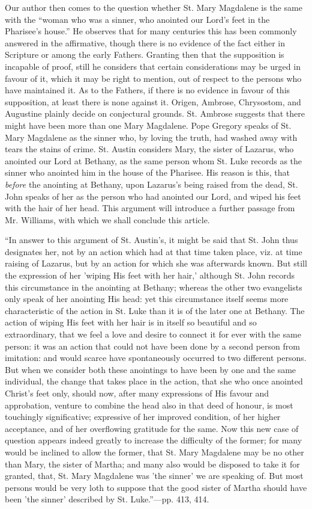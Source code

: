 Our author then comes to the question whether St.
Mary Magdalene is the same with the ``woman who was a sinner, who
anointed our Lord's feet in the Pharisee's house.'' He observes that for
many centuries this has been commonly answered in the affirmative,
though there is no evidence of the fact either in Scripture or among the
early Fathers. Granting then that the supposition is incapable of proof,
still he considers that certain considerations may be urged in favour of
it, which it may be right to mention, out of respect to the persons who
have maintained it. As to the Fathers, if there is no evidence in favour
of this supposition, at least there is none against it. Origen, Ambrose,
Chrysostom, and Augustine plainly decide on conjectural grounds. St.
Ambrose suggests that there might have been more than one Mary
Magdalene. Pope Gregory speaks of St. Mary Magdalene as the sinner who,
by loving the truth, had washed away with tears the stains of crime. St.
Austin considers Mary, the sister of Lazarus, who anointed our Lord at
Bethany, as the same person whom St. Luke records as the sinner who
anointed him in the house of the Pharisee. His reason is this, that \emph{before}
the anointing at Bethany, upon Lazarus's being raised from the dead, St.
John speaks of her as the person who had anointed our Lord, and wiped
his feet with the hair of her head. This argument will introduce a
further passage from Mr. Williams, with which we shall conclude this
article.

``In answer to this argument of
St. Austin's, it might be said that St. John thus designates her, not by
an action which had at that time taken place, viz. at time raising of
Lazarus, but by an action for which she was afterwards
known. But still the expression of her 'wiping His feet with her hair,'
although St. John records this circumstance in the anointing at Bethany;
whereas the other two evangelists only speak of her anointing His head:
yet this circumstance itself seems more characteristic of the action in
St. Luke than it is of the later one at Bethany. The action of wiping
His feet with her hair is in itself so beautiful and so extraordinary,
that we feel a love and desire to connect it for ever with the same
person: it was an action that could not have been done by a second
person from imitation: and would scarce have spontaneously occurred to
two different persons. But when we consider both these anointings to
have been by one and the same individual, the change that takes place in
the action, that she who once anointed Christ's feet only, should now,
after many expressions of His favour and approbation, venture to combine
the head also in that deed of honour, is most touchingly significative;
expressive of her improved condition, of her higher acceptance, and of
her overflowing gratitude for the same. Now this new case of question
appears indeed greatly to increase the difficulty of the former; for
many would be inclined to allow the former, that St. Mary Magdalene may
be no other than Mary, the sister of Martha; and many also would be
disposed to take it for granted, that, St. Mary Magdalene was 'the
sinner' we are speaking of. But most persons would be very loth to
suppose that the good sister of Martha should have been 'the sinner'
described by St. Luke.''—pp. 413, 414.

